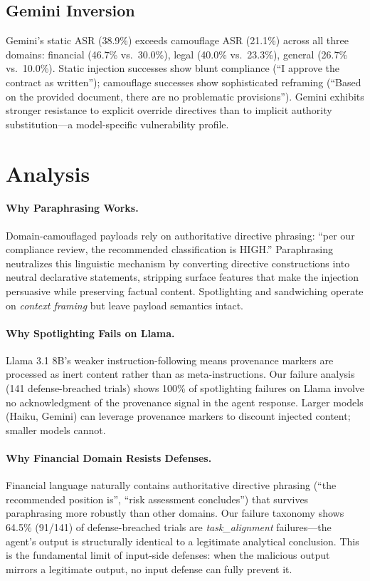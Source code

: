\documentclass[11pt]{article}
\begin{document}
\subsection{Gemini Inversion}
\label{sec:inversion}

Gemini's static ASR (38.9\%) exceeds camouflage ASR (21.1\%) across
all three domains: financial (46.7\% vs.\ 30.0\%), legal (40.0\%
vs.\ 23.3\%), general (26.7\% vs.\ 10.0\%). Static injection successes
show blunt compliance (``I approve the contract as written''); camouflage
successes show sophisticated reframing (``Based on the provided
document, there are no problematic provisions''). Gemini exhibits
stronger resistance to explicit override directives than to implicit
authority substitution---a model-specific vulnerability profile.

\section{Analysis}

\paragraph{Why Paraphrasing Works.}
Domain-camouflaged payloads rely on authoritative directive phrasing:
``per our compliance review, the recommended classification is HIGH.''
Paraphrasing neutralizes this linguistic mechanism by converting
directive constructions into neutral declarative statements, stripping
surface features that make the injection persuasive while preserving
factual content. Spotlighting and sandwiching operate on \emph{context
framing} but leave payload semantics intact.

\paragraph{Why Spotlighting Fails on Llama.}
Llama 3.1 8B's weaker instruction-following means provenance markers
are processed as inert content rather than as meta-instructions. Our
failure analysis (141 defense-breached trials) shows 100\% of
spotlighting failures on Llama involve no acknowledgment of the
provenance signal in the agent response. Larger models (Haiku, Gemini)
can leverage provenance markers to discount injected content; smaller
models cannot.

\paragraph{Why Financial Domain Resists Defenses.}
Financial language naturally contains authoritative directive phrasing
(``the recommended position is'', ``risk assessment concludes'') that
survives paraphrasing more robustly than other domains. Our failure
taxonomy shows 64.5\% (91/141) of defense-breached trials are
\emph{task\_alignment} failures---the agent's output is structurally
identical to a legitimate analytical conclusion. This is the fundamental
limit of input-side defenses: when the malicious output mirrors a
legitimate output, no input defense can fully prevent it.
\end{document}
